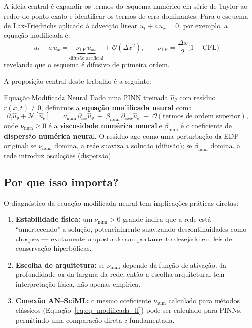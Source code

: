 \documentclass[12pt, a4paper]{article}
\theoremstyle{definition}
\newcommand{\pinn}{\hat{u}_\theta}
\begin{document}
A ideia central é expandir os termos do esquema numérico em série de Taylor ao redor
do ponto exato e identificar os termos de erro dominantes. Para o esquema de
Lax-Friedrichs aplicado à advecção linear $u_t + a\,u_x = 0$, por exemplo,
a equação modificada é:
\begin{equation}
    u_t + a\,u_x = \underbrace{\nu_{\mathrm{LF}}\, u_{xx}}_{\text{difusão artificial}}
    + \mathcal{O}(\Delta x^2),
    \qquad
    \nu_{\mathrm{LF}} = \frac{\Delta x}{2}\bigl(1 - \mathrm{CFL}\bigr),
    \label{eq:eq_modificada_lf}
\end{equation}
revelando que o esquema é difusivo de primeira ordem.

A proposição central deste trabalho é a seguinte:

\begin{definicaobox}{Equação Modificada Neural}
Dado uma PINN treinada $\pinn$ com resíduo $r(x,t) \neq 0$, definimos a
\textbf{equação modificada neural} como
\begin{equation}
    \partial_t \pinn + \mathcal{N}[\pinn]
    \;=\;
    \nu_{\mathrm{num}}\, \partial_{xx}\pinn
    \;+\;
    \beta_{\mathrm{num}}\, \partial_{xxx}\pinn
    \;+\;
    \mathcal{O}(\text{termos de ordem superior}),
    \label{eq:eq_modificada_neural}
\end{equation}
onde $\nu_{\mathrm{num}} \geq 0$ é a \textbf{viscosidade numérica neural} e
$\beta_{\mathrm{num}}$ é o coeficiente de \textbf{dispersão numérica neural}.
O resíduo age como uma perturbação da EDP original: se $\nu_{\mathrm{num}}$
domina, a rede suaviza a solução (difusão); se $\beta_{\mathrm{num}}$ domina,
a rede introduz oscilações (dispersão).
\end{definicaobox}

\subsection{Por que isso importa?}

O diagnóstico da equação modificada neural tem implicações práticas diretas:

\begin{enumerate}
    \item \textbf{Estabilidade física:} um $\nu_{\mathrm{num}} > 0$ grande indica que
    a rede está ``amortecendo'' a solução, potencialmente suavizando descontinuidades
    como choques --- exatamente o oposto do comportamento desejado em leis de conservação
    hiperbólicas.

    \item \textbf{Escolha de arquitetura:} se $\nu_{\mathrm{num}}$ depende da
    função de ativação, da profundidade ou da largura da rede, então a escolha
    arquitetural tem interpretação física, não apenas empírica.

    \item \textbf{Conexão AN--SciML:} o mesmo coeficiente $\nu_{\mathrm{num}}$
    calculado para métodos clássicos (Equação~\ref{eq:eq_modificada_lf}) pode ser
    calculado para PINNs, permitindo uma comparação direta e fundamentada.
\end{enumerate}
\end{document}
